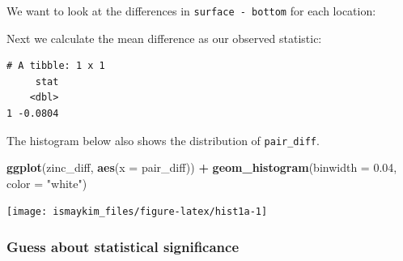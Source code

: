 \documentclass[12pt,]{krantz}
\makeatletter
\newenvironment{Shaded}{\begin{snugshade}}{\end{snugshade}}
\newcommand{\KeywordTok}[1]{\textcolor[rgb]{0.27,0.27,0.27}{\textbf{#1}}}
\newcommand{\DataTypeTok}[1]{\textcolor[rgb]{0.27,0.27,0.27}{#1}}
\newcommand{\FloatTok}[1]{\textcolor[rgb]{0.06,0.06,0.06}{#1}}
\newcommand{\StringTok}[1]{\textcolor[rgb]{0.5,0.5,0.5}{#1}}
\newcommand{\OperatorTok}[1]{\textcolor[rgb]{0.43,0.43,0.43}{\textbf{#1}}}
\newcommand{\NormalTok}[1]{#1}
\newenvironment{kframe}{%
\medskip{}
\setlength{\fboxsep}{.8em}
 \def\at@end@of@kframe{}%
 \ifinner\ifhmode%
  \def\at@end@of@kframe{\end{minipage}}%
  \begin{minipage}{\columnwidth}%
 \fi\fi%
 \def\FrameCommand##1{\hskip\@totalleftmargin \hskip-\fboxsep
 \colorbox{shadecolor}{##1}\hskip-\fboxsep
     \hskip-\linewidth \hskip-\@totalleftmargin \hskip\columnwidth}%
 \MakeFramed {\advance\hsize-\width
   \@totalleftmargin\z@ \linewidth\hsize
   \@setminipage}}%
 {\par\unskip\endMakeFramed%
 \at@end@of@kframe}
\renewenvironment{Shaded}{\begin{kframe}}{\end{kframe}}
\theoremstyle{definition}
\theoremstyle{definition}
\theoremstyle{definition}
\theoremstyle{remark}
\makeatother
\begin{document}
We want to look at the differences in \texttt{surface\ -\ bottom} for
each location:

\begin{Shaded}
\end{Shaded}

Next we calculate the mean difference as our observed statistic:

\begin{Shaded}
\end{Shaded}

\begin{verbatim}
# A tibble: 1 x 1
     stat
    <dbl>
1 -0.0804
\end{verbatim}

The histogram below also shows the distribution of \texttt{pair\_diff}.

\begin{Shaded}
\begin{Highlighting}[]
\KeywordTok{ggplot}\NormalTok{(zinc_diff, }\KeywordTok{aes}\NormalTok{(}\DataTypeTok{x =}\NormalTok{ pair_diff)) }\OperatorTok{+}
\StringTok{  }\KeywordTok{geom_histogram}\NormalTok{(}\DataTypeTok{binwidth =} \FloatTok{0.04}\NormalTok{, }\DataTypeTok{color =} \StringTok{"white"}\NormalTok{)}
\end{Highlighting}
\end{Shaded}

\begin{center}\texttt{[image: ismaykim\_files/figure-latex/hist1a-1]} \end{center}

\subsubsection*{Guess about statistical
significance}\label{guess-about-statistical-significance-4}
\end{document}
